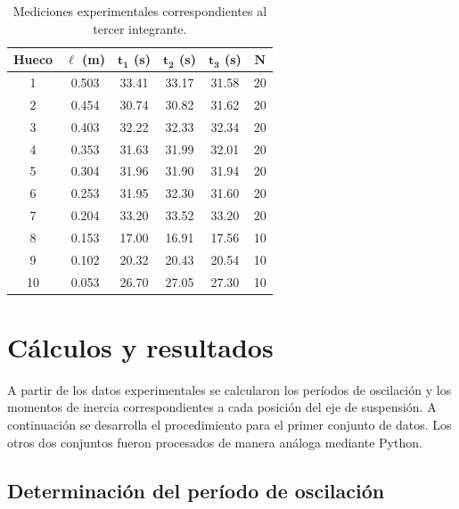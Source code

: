\documentclass[11pt,a4paper]{article}
\begin{document}
\begin{table}[H]
    \centering
    \small
    \renewcommand{\arraystretch}{0.92}
    \setlength{\tabcolsep}{9pt}

    \begin{tabular}{cccccc}
        \toprule
        \textbf{Hueco} &
        $\boldsymbol{\ell}$ \textbf{(m)} &
        $\boldsymbol{t_1}$ \textbf{(s)} &
        $\boldsymbol{t_2}$ \textbf{(s)} &
        $\boldsymbol{t_3}$ \textbf{(s)} &
        $\boldsymbol{N}$ \\
        \midrule

        1  & 0.503 & 33.41 & 33.17 & 31.58 & 20 \\
        2  & 0.454 & 30.74 & 30.82 & 31.62 & 20 \\
        3  & 0.403 & 32.22 & 32.33 & 32.34 & 20 \\
        4  & 0.353 & 31.63 & 31.99 & 32.01 & 20 \\
        5  & 0.304 & 31.96 & 31.90 & 31.94 & 20 \\
        6  & 0.253 & 31.95 & 32.30 & 31.60 & 20 \\
        7  & 0.204 & 33.20 & 33.52 & 33.20 & 20 \\
        8  & 0.153 & 17.00 & 16.91 & 17.56 & 10 \\
        9  & 0.102 & 20.32 & 20.43 & 20.54 & 10 \\
        10 & 0.053 & 26.70 & 27.05 & 27.30 & 10 \\

        \bottomrule
    \end{tabular}

    \caption{Mediciones experimentales correspondientes al tercer integrante.}
    \label{tab:datos_integrante3}
\end{table}

\newpage
\section{Cálculos y resultados}

A partir de los datos experimentales se calcularon los períodos de
oscilación y los momentos de inercia correspondientes a cada posición
del eje de suspensión. A continuación se desarrolla el procedimiento
para el primer conjunto de datos. Los otros dos conjuntos fueron
procesados de manera análoga mediante Python.

\subsection{Determinación del período de oscilación}
\end{document}
